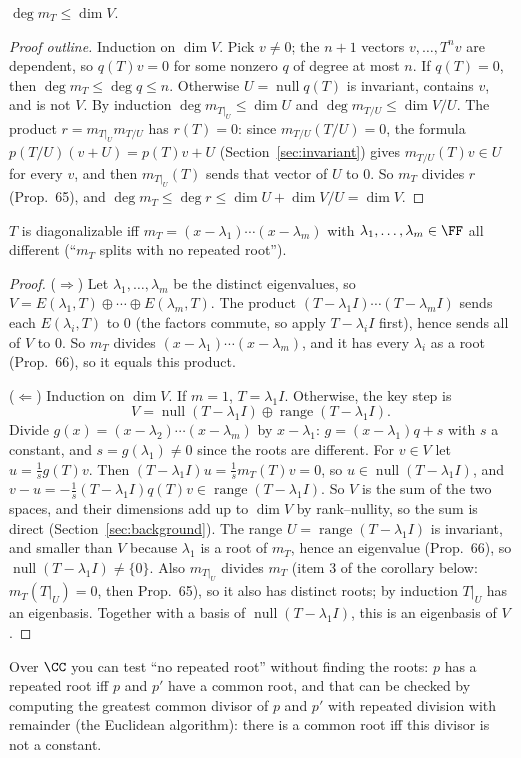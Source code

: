 \documentclass[10pt]{scrartcl}
\DeclareMathOperator{\nul}{null}
\DeclareMathOperator{\range}{range}
\begin{document}
\begin{proposition*}
  $\deg m_T\le\dim V$.
\end{proposition*}
\begin{proof}[Proof outline]
  Induction on $\dim V$. Pick $v\ne0$; the $n+1$ vectors $v,\dots,T^nv$ are dependent, so $q(T)v=0$ for some nonzero $q$ of degree at most $n$. If $q(T)=0$, then $\deg m_T\le\deg q\le n$. Otherwise $U=\nul q(T)$ is invariant, contains $v$, and is not $V$. By induction $\deg m_{T|_U}\le\dim U$ and $\deg m_{T/U}\le\dim V/U$. The product $r=m_{T|_U}m_{T/U}$ has $r(T)=0$: since $m_{T/U}(T/U)=0$, the formula $p(T/U)(v+U)=p(T)v+U$ (Section~\ref{sec:invariant}) gives $m_{T/U}(T)v\in U$ for every $v$, and then $m_{T|_U}(T)$ sends that vector of $U$ to $0$. So $m_T$ divides $r$ (Prop.~65), and $\deg m_T\le\deg r\le\dim U+\dim V/U=\dim V$.
\end{proof}

\begin{theorem*}
  $T$ is diagonalizable iff $m_T=(x-\lambda_1)\cdots(x-\lambda_m)$ with $\lambda_1,\dots,\lambda_m\in\FF$ all different (``$m_T$ splits with no repeated root'').
\end{theorem*}
\begin{proof}
  ($\Rightarrow$) Let $\lambda_1,\dots,\lambda_m$ be the distinct eigenvalues, so $V=E(\lambda_1,T)\oplus\cdots\oplus E(\lambda_m,T)$. The product $(T-\lambda_1I)\cdots(T-\lambda_mI)$ sends each $E(\lambda_i,T)$ to $0$ (the factors commute, so apply $T-\lambda_iI$ first), hence sends all of $V$ to $0$. So $m_T$ divides $(x-\lambda_1)\cdots(x-\lambda_m)$, and it has every $\lambda_i$ as a root (Prop.~66), so it equals this product.

  ($\Leftarrow$) Induction on $\dim V$. If $m=1$, $T=\lambda_1I$. Otherwise, the key step is
  \[ V=\nul(T-\lambda_1I)\oplus\range(T-\lambda_1I). \]
  Divide $g(x)=(x-\lambda_2)\cdots(x-\lambda_m)$ by $x-\lambda_1$: $g=(x-\lambda_1)q+s$ with $s$ a constant, and $s=g(\lambda_1)\ne0$ since the roots are different. For $v\in V$ let $u=\tfrac1sg(T)v$. Then $(T-\lambda_1I)u=\tfrac1sm_T(T)v=0$, so $u\in\nul(T-\lambda_1I)$, and $v-u=-\tfrac1s(T-\lambda_1I)q(T)v\in\range(T-\lambda_1I)$. So $V$ is the sum of the two spaces, and their dimensions add up to $\dim V$ by rank--nullity, so the sum is direct (Section~\ref{sec:background}). The range $U=\range(T-\lambda_1I)$ is invariant, and smaller than $V$ because $\lambda_1$ is a root of $m_T$, hence an eigenvalue (Prop.~66), so $\nul(T-\lambda_1I)\ne\{0\}$. Also $m_{T|_U}$ divides $m_T$ (item 3 of the corollary below: $m_T(T|_U)=0$, then Prop.~65), so it also has distinct roots; by induction $T|_U$ has an eigenbasis. Together with a basis of $\nul(T-\lambda_1I)$, this is an eigenbasis of $V$.
\end{proof}
Over $\CC$ you can test ``no repeated root'' without finding the roots: $p$ has a repeated root iff $p$ and $p'$ have a common root, and that can be checked by computing the greatest common divisor of $p$ and $p'$ with repeated division with remainder (the Euclidean algorithm): there is a common root iff this divisor is not a constant.
\end{document}
